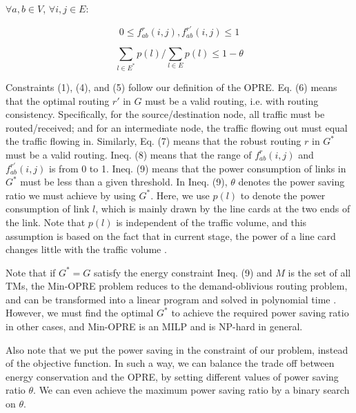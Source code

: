 \documentclass[conference]{IEEEtran}
\begin{document}
\begin{center}
    \vspace{0.1in}
    $\forall a,b \in V$, $\forall i,j \in E$: \quad \quad \quad \quad \quad \quad \quad \quad \quad \quad \quad 
    \vspace{-0.15in}
\end{center}

\begin{equation}
    0 \leq f^r_{ab}(i,j),f^{r'}_{ab}(i,j) \leq 1
\end{equation}

\begin{equation}
    \sum_{l \in E^*} p(l) / \sum_{l \in E} p(l) \leq 1 - \theta
\end{equation}

Constraints (1), (4), and (5) follow our definition of the OPRE. Eq. (6) means that the optimal routing $r'$ in $G$ must be a valid routing, i.e. with routing consistency. Specifically, for the source/destination node, all traffic must be routed/received; and for an intermediate node, the traffic flowing out must equal the traffic flowing in. Similarly, Eq. (7) means that the robust routing $r$ in $G^*$ must be a valid routing. Ineq. (8) means that the range of $f^r_{ab}(i,j)$ and $f^{r'}_{ab}(i,j)$ is from 0 to 1. Ineq. (9) means that the power consumption of links in $G^*$ must be less than a given threshold. In Ineq. (9), $\theta$ denotes the power saving ratio we must achieve by using $G^*$. Here, we use $p(l)$ to denote the power consumption of link $l$, which is mainly drawn by the line cards at the two ends of the link. Note that $p(l)$ is independent of the traffic volume, and this assumption is based on the fact that in current stage, the power of a line card changes little with the traffic volume \cite{networking:hopbyhop}.

Note that if $G^* = G$ satisfy the energy constraint Ineq. (9) and $M$ is the set of all TMs, the Min-OPRE problem reduces to the demand-oblivious routing problem, and can be transformed into a linear program and solved in polynomial time \cite{networking:oblivious}. However, we must find the optimal $G^*$ to achieve the required power saving ratio in other cases, and Min-OPRE is an MILP and is NP-hard in general.

Also note that we put the power saving in the constraint of our problem, instead of the objective function. In such a way, we can balance the trade off between energy conservation and the OPRE, by setting different values of power saving ratio $\theta$. We can even achieve the maximum power saving ratio by a binary search on $\theta$.
\end{document}
